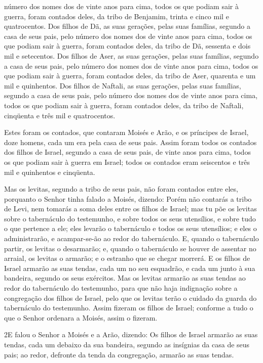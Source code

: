 número dos nomes dos de vinte anos para cima, todos os que podiam
sair à guerra, foram contados deles, da tribo de Benjamim,
trinta e cinco mil e quatrocentos. Dos filhos de Dã, as suas
gerações, pelas suas famílias, segundo a casa de seus pais, pelo
número dos nomes dos de vinte anos para cima, todos os que podiam
sair à guerra, foram contados deles, da tribo de Dã, sessenta
e dois mil e setecentos. Dos filhos de Aser, as suas
gerações, pelas suas famílias, segundo a casa de seus pais, pelo
número dos nomes dos de vinte anos para cima, todos os que podiam
sair à guerra, foram contados deles, da tribo de Aser,
quarenta e um mil e quinhentos. Dos filhos de Naftali, as
suas gerações, pelas suas famílias, segundo a casa de seus pais,
pelo número dos nomes dos de vinte anos para cima, todos os que
podiam sair à guerra, foram contados deles, da tribo de
Naftali, cinqüenta e três mil e quatrocentos.

Estes foram os contados, que contaram Moisés e Arão, e os
príncipes de Israel, doze homens, cada um era pela casa de seus
pais. Assim foram todos os contados dos filhos de Israel,
segundo a casa de seus pais, de vinte anos para cima, todos os que
podiam sair à guerra em Israel; todos os contados eram
seiscentos e três mil e quinhentos e cinqüenta.

Mas os levitas, segundo a tribo de seus pais, não foram contados
entre eles, porquanto o Senhor tinha falado a Moisés,
dizendo: Porém não contarás a tribo de Levi, nem tomarás a
soma deles entre os filhos de Israel; mas tu põe os levitas
sobre o tabernáculo do testemunho, e sobre todos os seus utensílios,
e sobre tudo o que pertence a ele; eles levarão o tabernáculo e
todos os seus utensílios; e eles o administrarão, e acampar-se-ão ao
redor do tabernáculo. E, quando o tabernáculo partir, os
levitas o desarmarão; e, quando o tabernáculo se houver de assentar
no arraial, os levitas o armarão; e o estranho que se chegar
morrerá. E os filhos de Israel armarão as suas tendas, cada
um no seu esquadrão, e cada um junto à sua bandeira, segundo os seus
exércitos. Mas os levitas armarão as suas tendas ao redor do
tabernáculo do testemunho, para que não haja indignação sobre a
congregação dos filhos de Israel, pelo que os levitas terão o
cuidado da guarda do tabernáculo do testemunho. Assim fizeram
os filhos de Israel; conforme a tudo o que o Senhor ordenara a
Moisés, assim o fizeram.

\medskip

\lettrine{2} E falou o Senhor a Moisés e a Arão, dizendo:
Os filhos de Israel armarão as suas tendas, cada um debaixo da
sua bandeira, segundo as insígnias da casa de seus pais; ao redor,
defronte da tenda da congregação, armarão as suas tendas.

